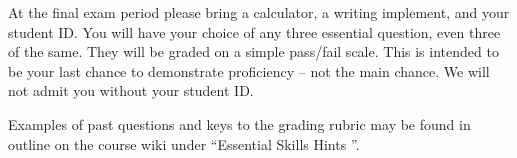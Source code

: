 \documentclass[letterpaper,10pt]{article}
\begin{document}
At the final exam period please bring a calculator, a writing implement, and
your student ID.  You will have your choice of any three essential
question, even three of the same.  They will be graded on a simple
pass/fail scale.  This is intended to be your last chance to
demonstrate proficiency -- not the main chance.  We will not admit you
without your student ID.

Examples of past questions and keys to the grading rubric may be found
in outline on the course wiki under ``Essential Skills Hints ''.



\end{document}
